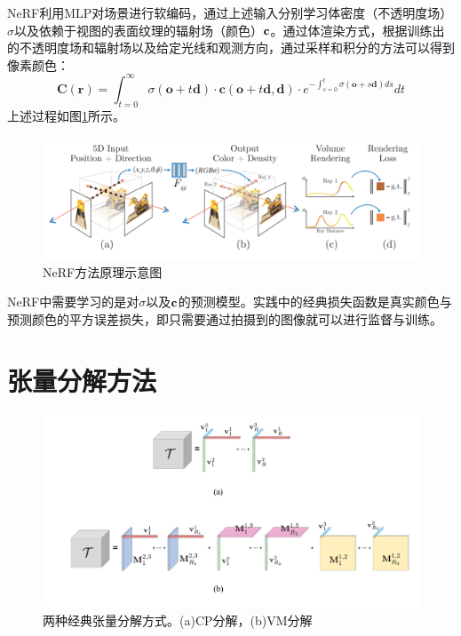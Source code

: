 \documentclass[10pt,twocolumn,letterpaper]{article}
\begin{document}
NeRF利用MLP对场景进行软编码，通过上述输入分别学习体密度（不透明度场）$\sigma$以及依赖于视图的表面纹理的辐射场（颜色）$\bold c$。通过体渲染方式，根据训练出的不透明度场和辐射场以及给定光线和观测方向，通过采样和积分的方法可以得到像素颜色：
\begin{equation}
  \mathbf{C}(\mathbf{r})=\int_{t=0}^{\infty} \sigma(\mathbf{o}+t \mathbf{d}) \cdot \mathbf{c}(\mathbf{o}+t \mathbf{d}, \mathbf{d}) \cdot e^{-\int_{s=0}^{t} \sigma(\mathbf{o}+s \mathbf{d}) d s} d t
\end{equation}
\label{eq:2}
上述过程如图\ref{fig:nerf}所示。
\begin{figure}[b]
  \centering
  \includegraphics[width=1.0\linewidth]{fig/nerf.png}
  \caption{NeRF方法原理示意图}
  \label{fig:nerf}
\end{figure}

NeRF中需要学习的是对$\sigma$以及$\bold c$的预测模型。实践中的经典损失函数是真实颜色与预测颜色的平方误差损失，即只需要通过拍摄到的图像就可以进行监督与训练。

\section{张量分解方法}
\label{sec:td}

\begin{figure}
  \centering
  \includegraphics[width=1.0\linewidth]{fig/CPVM.jpg}
  \caption{两种经典张量分解方式。(a)CP分解，(b)VM分解}
  \label{fig:cpvm}
\end{figure}
\end{document}
